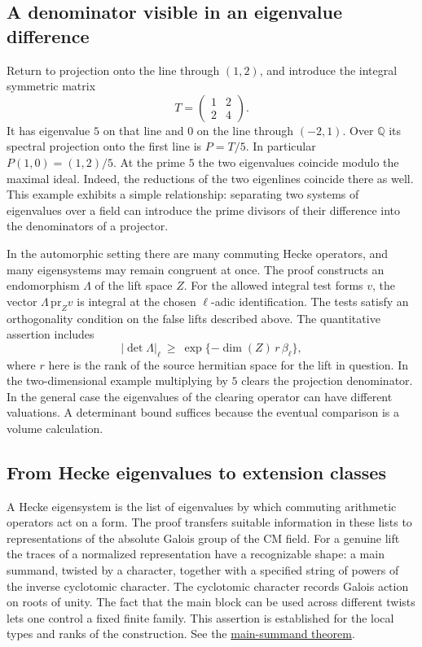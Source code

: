 \documentclass[11pt,letterpaper]{article}
\newcommand{\sref}[2]{\href{https://github.com/VladimirReshetnikov/ProveIt/blob/d8415e76ad850651f8c0083afe689dd9f4a45a10/Analysis/GeneralizedRiemannHypothesis/vendor/grh-lean/grh/src/#1.lean}{#2}}
\begin{document}
\subsection{A denominator visible in an eigenvalue difference}
Return to projection onto the line through \((1,2)\), and introduce the integral symmetric matrix
\[
      T=\begin{pmatrix}1&2\\2&4\end{pmatrix}.
\]
It has eigenvalue \(5\) on that line and \(0\) on the line through \((-2,1)\). Over \(\mathbb Q\) its spectral projection onto the first line is \(P=T/5\). In particular \(P(1,0)=(1,2)/5\). At the prime \(5\) the two eigenvalues coincide modulo the maximal ideal. Indeed, the reductions of the two eigenlines coincide there as well. This example exhibits a simple relationship: separating two systems of eigenvalues over a field can introduce the prime divisors of their difference into the denominators of a projector.

In the automorphic setting there are many commuting Hecke operators, and many eigensystems may remain congruent at once. The proof constructs an endomorphism \(\Lambda\) of the lift space \(Z\). For the allowed integral test forms \(v\), the vector \(\Lambda\,\mathrm{pr}_Z v\) is integral at the chosen \(\ell\)-adic identification. The tests satisfy an orthogonality condition on the false lifts described above. The quantitative assertion includes
\[
       \bigl|\det\Lambda\bigr|_\ell
          \ \geq\ \exp\{-\dim(Z)\,r\,\beta_\ell\},
\]
where \(r\) here is the rank of the source hermitian space for the lift in question. In the two-dimensional example multiplying by \(5\) clears the projection denominator. In the general case the eigenvalues of the clearing operator can have different valuations. A determinant bound suffices because the eventual comparison is a volume calculation.

\subsection{From Hecke eigenvalues to extension classes}
A Hecke eigensystem is the list of eigenvalues by which commuting arithmetic operators act on a form. The proof transfers suitable information in these lists to representations of the absolute Galois group of the CM field. For a genuine lift the traces of a normalized representation have a recognizable shape: a main summand, twisted by a character, together with a specified string of powers of the inverse cyclotomic character. The cyclotomic character records Galois action on roots of unity. The fact that the main block can be used across different twists lets one control a fixed finite family. This assertion is established for the local types and ranks of the construction. See the \sref{New/Congruences/GaloisRepresentations/RowsFromEigensystems}{main-summand theorem}.
\end{document}
